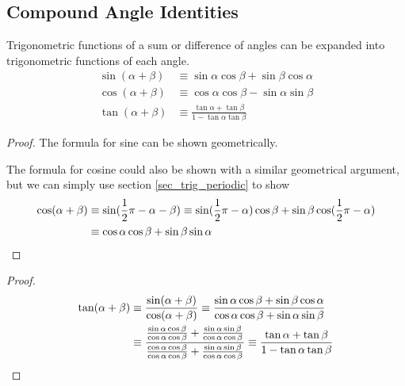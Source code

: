 \subsection{Compound Angle Identities} \label{sec_comp_angle}


\begin{theorem}
 Trigonometric functions of a sum or difference of angles can be expanded into
 trigonometric functions of each angle.
 \begin{align*}
  \sin(\alpha + \beta) &\equiv
     \sin \alpha \cos \beta +  \sin \beta \cos \alpha \\
  \cos(\alpha + \beta) &\equiv
     \cos \alpha \cos \beta - \sin \alpha \sin \beta \\
  \tan(\alpha + \beta) &\equiv
      \frac{\tan \alpha + \tan \beta}{1 - \tan \alpha \tan \beta}
 \end{align*}
\end{theorem}
\begin{proof}
 The formula for sine can be shown geometrically.

 The formula for cosine could also be shown with a similar geometrical argument,
 but we can simply use section \ref{sec_trig_periodic} to show
 \begin{align*}
  \cos(\alpha + \beta) &\equiv
      \sin(\frac 12 \pi - \alpha - \beta) \equiv
      \sin(\frac 12 \pi - \alpha)\cos \beta +
          \sin \beta \cos(\frac 12 \pi - \alpha) \\
  &\equiv
      \cos \alpha \cos \beta + \sin \beta \sin \alpha \qedhere
 \end{align*}
\end{proof}
\begin{proof}
 \begin{align*}
  \tan(\alpha + \beta) &\equiv
      \frac{\sin(\alpha + \beta)}{\cos(\alpha + \beta)} \equiv
      \frac{\sin \alpha \cos \beta + \sin \beta \cos \alpha}
           {\cos \alpha \cos \beta + \sin \alpha \sin \beta} \\
      &\equiv \frac{
            \frac{\sin \alpha \cos \beta}{\cos \alpha \cos \beta} +
            \frac{\sin \alpha \sin \beta}{\cos \alpha \cos \beta}}
           {\frac{\cos \alpha \cos \beta}{\cos \alpha \cos \beta} +
            \frac{\sin \alpha \sin \beta}{\cos \alpha \cos \beta}}
           \equiv
      \frac{\tan \alpha + \tan \beta}{1 - \tan \alpha \tan \beta} \qedhere
 \end{align*}
\end{proof}

